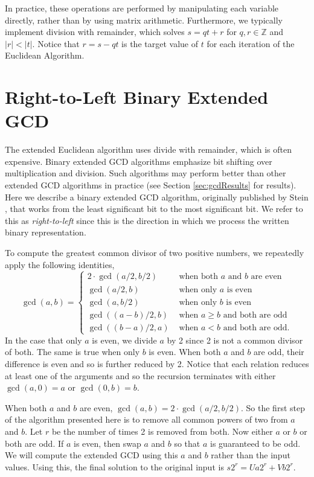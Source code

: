 \documentclass{ucalgthes1}
\theoremstyle{definition}
\newcommand{\ZZ}{\mathbb{Z}}
\begin{document}
In practice, these operations are performed by manipulating each variable directly, rather than by using matrix arithmetic.  Furthermore, we typically implement division with remainder, which solves $s = qt + r$ for $q,r \in \ZZ$ and $|r| < |t|$.  Notice that $r = s - qt$ is the target value of $t$ for each iteration of the Euclidean Algorithm.


\section{Right-to-Left Binary Extended GCD}
\label{sec:gcdR2LBin}

The extended Euclidean algorithm uses divide with remainder, which is often expensive.  Binary extended GCD algorithms emphasize bit shifting over multiplication and division.  Such algorithms may perform better than other extended GCD algorithms in practice (see Section \ref{sec:gcdResults} for results).  Here we describe a binary extended GCD algorithm, originally published by Stein \cite{Stein1967}, that works from the least significant bit to the most significant bit.  We refer to this as \emph{right-to-left} since this is the direction in which we process the written binary representation.

To compute the greatest common divisor of two positive numbers, we repeatedly apply the following identities,
\[
	\gcd(a, b) = \begin{cases}
		2 \cdot \gcd(a/2, b/2) & \textrm{ when both $a$ and $b$ are even} \\
		\gcd(a/2, b) & \textrm{ when only $a$ is even} \\
		\gcd(a, b/2) & \textrm{ when only $b$ is even} \\
		\gcd((a-b)/2, b) & \textrm{ when $a \ge b$ and both are odd} \\
		\gcd((b-a)/2, a) & \textrm{ when $a < b$ and both are odd}.
	\end{cases}
\]
In the case that only $a$ is even, we divide $a$ by 2 since 2 is not a common divisor of both.  The same is true when only $b$ is even.  When both $a$ and $b$ are odd, their difference is even and so is further reduced by 2.  Notice that each relation reduces at least one of the arguments and so the recursion terminates with either $\gcd(a, 0) = a$ or $\gcd(0, b) = b$.

When both $a$ and $b$ are even, $\gcd(a, b) = 2 \cdot \gcd(a/2, b/2)$.  So the first step of the algorithm presented here is to remove all common powers of two from $a$ and $b$.  Let $r$ be the number of times 2 is removed from both.  Now either $a$ or $b$ or both are odd.  If $a$ is even, then swap $a$ and $b$ so that $a$ is guaranteed to be odd.  We will compute the extended GCD using this $a$ and $b$ rather than the input values.  Using this, the final solution to the original input is $s2^r = Ua2^r + Vb2^r$.
\end{document}
